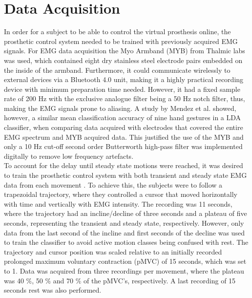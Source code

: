 \section{Data Acquisition}

In order for a subject to be able to control the virtual prosthesis online, the prosthetic control system needed to be trained with previously acquired EMG signals. For EMG data acquisition the Myo Armband (MYB) from Thalmic labs was used, which contained eight dry stainless steel electrode pairs embedded on the inside of the armband. Furthermore, it could communicate wirelessly to external devices via a Bluetooth 4.0 unit, making it a highly practical recording device with minimum preparation time needed. However, it had a fixed sample rate of 200 Hz with the exclusive analogue filter being a 50 Hz notch filter, thus, making the EMG signals prone to aliasing. A study by Mendez et al. \cite{Mendez2017} showed, however, a similar mean classification accuracy of nine hand gestures in a LDA classifier, when comparing data acquired with electrodes that covered the entire EMG spectrum and MYB acquired data. This justified the use of the MYB and only a 10 Hz cut-off second order Butterworth high-pass filter was implemented digitally to remove low frequency artefacts. \\
To account for the delay until steady state motions were reached, it was desired to train the prosthetic control system with both transient and steady state EMG data from each movement \cite{Boschmann2013}. To achieve this, the subjects were to follow a trapezoidal trajectory, where they controlled a cursor that moved horizontally with time and vertically with EMG intensity. The recording was 11 seconds, where the trajectory had an incline/decline of three seconds and a plateau of five seconds, representing the transient and steady state, respectively. However, only data from the last second of the incline and first seconds of the decline was used to train the classifier to avoid active motion classes being confused with rest. The trajectory and cursor position was scaled relative to an initially recorded prolonged maximum voluntary contraction (pMVC) of 15 seconds, which was set to 1. Data was acquired from three recordings per movement, where the plateau was 40 $\percent$, 50 $\percent$ and 70 $\percent$ of the pMVC's, respectively. A last recording of 15 seconds rest was also performed.

